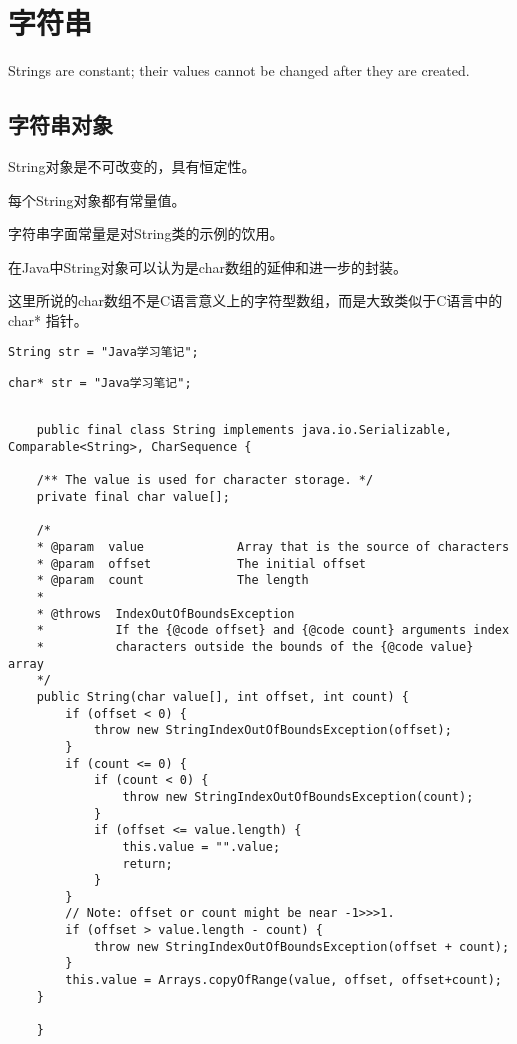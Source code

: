 \chapter{字符串}
\label{chap:string}

    Strings are constant; their values cannot be changed after they are created.

\section{字符串对象}

String对象是不可改变的，具有恒定性。

每个String对象都有常量值。

字符串字面常量是对String类的示例的饮用。

在Java中String对象可以认为是char数组的延伸和进一步的封装。

\begin{noteblock}
    这里所说的char数组不是C语言意义上的字符型数组，而是大致类似于C语言中的 char* 指针。 \par
    \begin{lstlisting}[style=cjava]
    String str = "Java学习笔记"; 
    \end{lstlisting}
    \begin{lstlisting}[style=cjava]
    char* str = "Java学习笔记";
    \end{lstlisting}
\end{noteblock}

\begin{lstlisting}[style=cjava]

    public final class String implements java.io.Serializable, Comparable<String>, CharSequence {

    /** The value is used for character storage. */
    private final char value[];

    /*
    * @param  value             Array that is the source of characters
    * @param  offset            The initial offset
    * @param  count             The length
    *
    * @throws  IndexOutOfBoundsException
    *          If the {@code offset} and {@code count} arguments index
    *          characters outside the bounds of the {@code value} array
    */
    public String(char value[], int offset, int count) {
        if (offset < 0) {
            throw new StringIndexOutOfBoundsException(offset);
        }
        if (count <= 0) {
            if (count < 0) {
                throw new StringIndexOutOfBoundsException(count);
            }
            if (offset <= value.length) {
                this.value = "".value;
                return;
            }
        }
        // Note: offset or count might be near -1>>>1.
        if (offset > value.length - count) {
            throw new StringIndexOutOfBoundsException(offset + count);
        }
        this.value = Arrays.copyOfRange(value, offset, offset+count);
    }

    }

\end{lstlisting}

